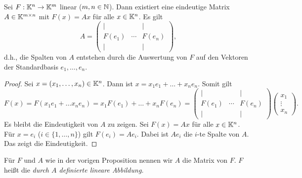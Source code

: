\begin{propn}
	Sei $ F : \mathbb K^n\to \mathbb K^m $ linear ($ m,n \in \mathbb N $). Dann existiert eine eindeutige Matrix $ A \in \mathbb K^{m \times n} $ mit $ F(x) = Ax $ für alle $ x \in \mathbb K^n $. Es gilt \[
		 A = \begin{pmatrix} 
		 | & & |
		 \\ F(e_1) & \cdots &  F(e_n) 
		 \\ | & & | \end{pmatrix}, 
	\]
	d.h., die Spalten von $A$ entstehen durch die Auswertung von $F$ auf den Vektoren der Standardbasis $e_1,\ldots,e_n$. 
\end{propn}
\begin{proof}
	Sei $ x = (x_1, \ldots, x_n) \in \mathbb K^n $. Dann ist $ x = x_1e_1 + \ldots + x_ne_n $. Somit gilt
	\begin{equation*}
		F(x) = F(x_1e_1 + \ldots x_ne_n) = x_1F(e_1) + \ldots + x_nF(e_n) = 
		\begin{pmatrix} 
		| & & |
		\\ F(e_1) & \cdots &  F(e_n) 
		\\ | & & | \end{pmatrix} 
		\begin{pmatrix}
		x_1 \\ \vdots \\ x_n
		\end{pmatrix}.
	\end{equation*}
	Es bleibt die Eindeutigkeit von $ A $ zu zeigen. Sei $ F(x) = Ax $ für alle $ x \in \mathbb K^n $. Für $ x = e_i $ ($ i \in \{ 1, \ldots, n \} $) gilt $ F(e_i) = Ae_i $. Dabei ist $ Ae_i $ die $ i $-te Spalte von $A$. Das zeigt die Eindeutigkeit. 
\end{proof}

\noindent Für $ F $ und $ A $ wie in der vorigen Proposition nennen wir $ A $ die Matrix von $ F $. $ F $ heißt die \emph{durch $ A $ definierte lineare Abbildung.}

